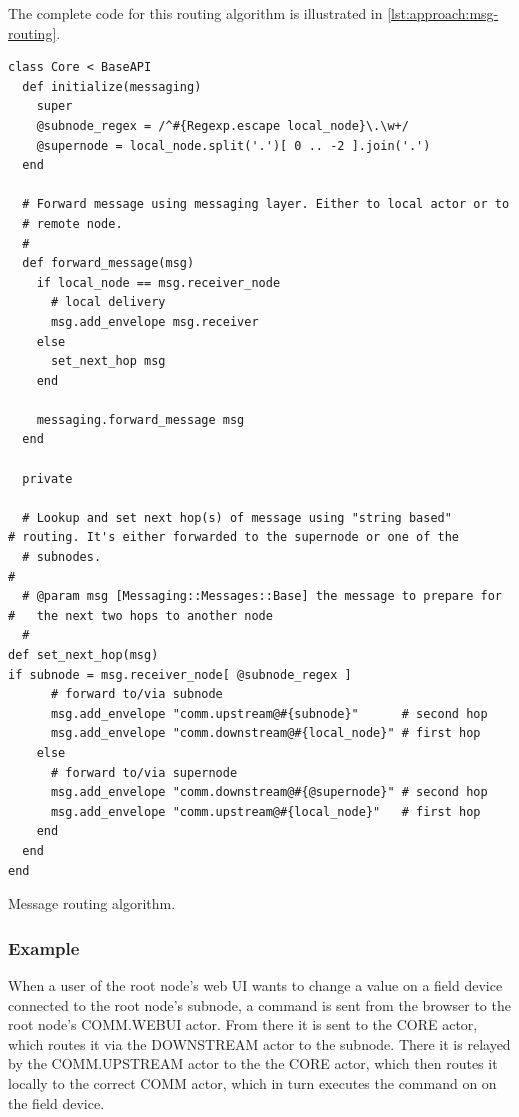  The complete code for this routing algorithm is illustrated in
 \autoref{lst:approach:msg-routing}.


\begin{listing}[H]
	\begin{verbatim}
class Core < BaseAPI
  def initialize(messaging)
    super
    @subnode_regex = /^#{Regexp.escape local_node}\.\w+/
    @supernode = local_node.split('.')[ 0 .. -2 ].join('.')
  end

  # Forward message using messaging layer. Either to local actor or to
  # remote node.
  #
  def forward_message(msg)
    if local_node == msg.receiver_node
      # local delivery
      msg.add_envelope msg.receiver
    else
      set_next_hop msg
    end

    messaging.forward_message msg
  end

  private

  # Lookup and set next hop(s) of message using "string based"                                                                                                             # routing. It's either forwarded to the supernode or one of the
  # subnodes.                                                                                                                                                              #
  # @param msg [Messaging::Messages::Base] the message to prepare for                                                                                                      #   the next two hops to another node
  #                                                                                                                                                                        def set_next_hop(msg)                                                                                                                                                      if subnode = msg.receiver_node[ @subnode_regex ]
      # forward to/via subnode
      msg.add_envelope "comm.upstream@#{subnode}"      # second hop
      msg.add_envelope "comm.downstream@#{local_node}" # first hop
    else
      # forward to/via supernode
      msg.add_envelope "comm.downstream@#{@supernode}" # second hop
      msg.add_envelope "comm.upstream@#{local_node}"   # first hop
    end
  end
end
	\end{verbatim}
	\caption{Message routing algorithm.}
	\label{lst:approach:msg-routing}
\end{listing}


\subsubsection{Example}
When a user of the root node's web UI wants to change a value on a field device
connected to the root node's subnode, a command is sent from the browser to the
root node's COMM.WEBUI actor. From there it is sent to the CORE actor, which
routes it via the DOWNSTREAM actor to the subnode. There it is relayed by the
COMM.UPSTREAM actor to the the CORE actor, which then routes it locally to the
correct COMM actor, which in turn executes the command on on the field device.


